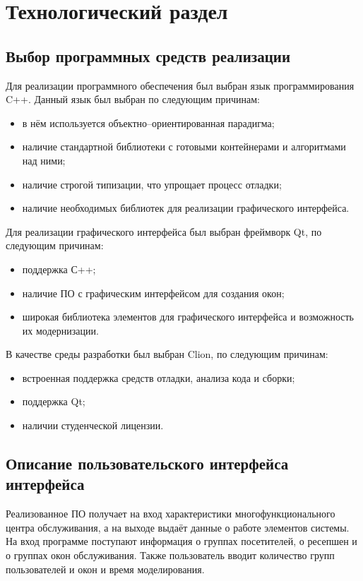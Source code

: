 \chapter{Технологический раздел}

\section{Выбор программных средств реализации}

Для реализации программного обеспечения был выбран язык программирования C++. Данный язык был выбран по следующим причинам:
\begin{itemize}[label=---]
	\item в нём используется объектно--ориентированная парадигма;
	\item наличие стандартной библиотеки с готовыми контейнерами и алгоритмами над ними;
	\item наличие строгой типизации, что упрощает процесс отладки;
	\item наличие необходимых библиотек для реализации графического интерфейса.
\end{itemize}

Для реализации графического интерфейса был выбран фреймворк Qt, по следующим причинам:
\begin{itemize}[label=---]
	\item поддержка С++;
	\item наличие ПО с графическим интерфейсом для создания окон;
	\item широкая библиотека элементов для графического интерфейса и возможность их модернизации.
\end{itemize}

В качестве среды разработки был выбран Clion, по следующим причинам:
\begin{itemize}[label=---]
	\item встроенная поддержка средств отладки, анализа кода и сборки;
	\item поддержка Qt;
	\item наличии студенческой лицензии.
\end{itemize}

\section{Описание пользовательского интерфейса\\интерфейса}

Реализованное ПО получает на вход характеристики многофункционального центра обслуживания, а на выходе выдаёт данные о работе элементов системы. На вход программе поступают информация о группах посетителей, о ресепшен и о группах окон обслуживания. Также пользователь вводит количество групп пользователей и окон и время моделирования.


